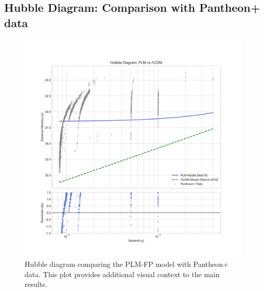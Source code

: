 \documentclass[12pt, a4paper]{article}
\begin{document}
\subsection{Hubble Diagram: Comparison with Pantheon+ data}
\begin{figure}[H]
    \centering
    \includegraphics[width=\textwidth]{hubble_diagram_comparison.png}
    \caption{Hubble diagram comparing the PLM-FP model with Pantheon+ data. This plot provides additional visual context to the main results.}
    \label{fig:appendix_hubble_diagram}
\end{figure}
\end{document}
